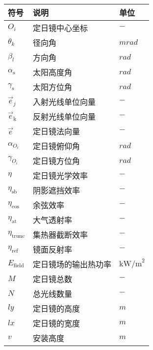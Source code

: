 \documentclass[../main.tex]{subfiles}
\begin{document}




\begin{table}[H]
    \centering
    \renewcommand{\arrayrulewidth}{2.0pt}
    \begin{tabular}{p{4cm}p{5cm}p{4cm}}
    \hline
    符号 & 说明 & 单位  \\ 
    \hline
    $O_i$         & 定日镜中心坐标         & $-$                      \\
    $\theta _k$   & 径向角                & $mrad$                   \\
    $\beta _l$    & 方向角                & $rad$                    \\
    $\alpha_{\text{s}}$      & 太阳高度角       & $rad$               \\
    $ \gamma _{\text{s}}$    & 太阳方位角       & $rad $              \\
    $\vec{e}_j$              & 入射光线单位向量  & $-$                 \\
    $\vec{e}_{\text{k}}$      & 反射光线单位向量  & $-$                 \\
    $\vec{e}$                & 定日镜法向量     & $-$                  \\
    $\alpha_{O_{i}}$         & 定日镜俯仰角     & $rad$                \\
    $\gamma_{O_{i}}$         & 定日镜方位角     & $rad$                \\
    $\eta$                   & 定日镜光学效率   & $-$                   \\
    $\eta_{\text{sb}}$       & 阴影遮挡效率     &$-$                    \\
    $\eta_{\text{cos}}$      & 余弦效率        &$-$                    \\
    $\eta_{\text{at}}$       & 大气透射率       &$-$                    \\
    $\eta_{\text{trunc}}$    & 集热器截断效率   &$-$                    \\
    $\eta_{\text{ref}}$      & 镜面反射率       &$-$                    \\   
    $E_{\text{field}}$       & 定日镜场的输出热功率     &$\text{kW/m}^2$                    \\
    $M$                      & 定日镜总数     &$-$                    \\
    $N$                      & 总光线数量      &$-$                    \\
    \(ly\)                   & 定日镜的高度    &$m$                    \\
    \(lx\)                   & 定日镜的宽度    &$m$                    \\
    $v$         & 安装高度    &$m$                    \\
    \hline
    \end{tabular}
    \end{table}
\end{document}

